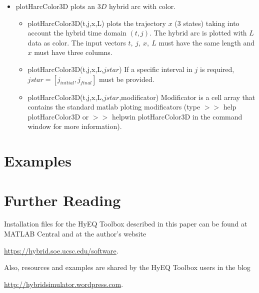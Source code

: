 \documentclass{article}
\begin{document}
\begin{itemize}
\item plotHarcColor3D plots an $3D$ hybrid arc with color.
\begin{itemize}
\item plotHarcColor3D(t,j,x,L) plots the trajectory $x$ (3 states) taking into account the hybrid time domain $(t,j)$. The hybrid arc is plotted with $L$ data as color. The input vectors $t,\ j,\ x,\ L$ must have the same length and $x$ must have three columns.
\item plotHarcColor3D(t,j,x,L,$jstar$) If a specific interval in $j$ is required, $jstar = [j_{initial},
 j_{final}]$ must be provided.
 \item plotHarcColor3D(t,j,x,L,$jstar$,modificator) Modificator is a cell array that contains the standard matlab ploting modificators (type $>>$ help plotHarcColor3D or $>>$ helpwin plotHarcColor3D in the command window for more information).
\end{itemize}
\end{itemize}



\section{Examples}
\label{sec:examples}















\section{Further Reading}
\label{sec:closingremarks}
\noindent Installation files for the HyEQ Toolbox described in this paper can be found at MATLAB Central and at the author's website
\begin{center}
\url{https://hybrid.soe.ucsc.edu/software}.
\end{center}
Also, resources and examples are shared by the HyEQ Toolbox users in the blog
\begin{center}
\url{http://hybridsimulator.wordpress.com}.
\end{center}
\end{document}
